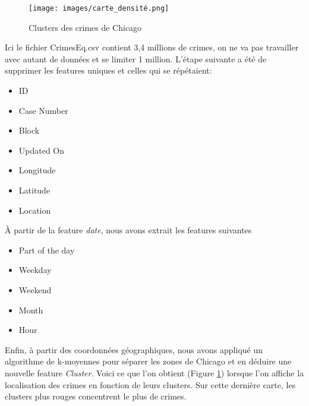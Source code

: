\documentclass{article}
\begin{document}
    \begin{figure}
	    \centering
	    \texttt{[image: images/carte\_densité.png]}
	    \caption{Clusters des crimes de Chicago}
	    \label{E}
    \end{figure}
    Ici le fichier CrimesEq.csv contient 3,4 millions de crimes, on ne va pas travailler avec 
    autant de données et se limiter 1 million.
    L'étape suivante a été de supprimer les features uniques et celles qui se répétaient:
    \begin{itemize}
	    \item ID
	    \item Case Number
	    \item Block
	    \item Updated On
	    \item Longitude
	    \item Latitude
	    \item Location
    \end{itemize}
    À partir de la feature \textit{date}, nous avons extrait les features suivantes
    \begin{itemize}
	    \item Part of the day
	    \item Weekday
	    \item Weekend
	    \item Month
	    \item Hour
    \end{itemize}
    Enfin, à partir des coordonnées géographiques, nous avons appliqué un algorithme
    de k-moyennes pour séparer les zones de Chicago et en déduire une nouvelle
    feature \textit{Cluster}. 
    Voici ce que l'on obtient (Figure \ref{E}) lorsque l'on affiche la localisation des crimes en
    fonction de leurs clusters.
    Sur cette dernière carte, les clusters plus rouges concentrent le plus de crimes.
\end{document}
